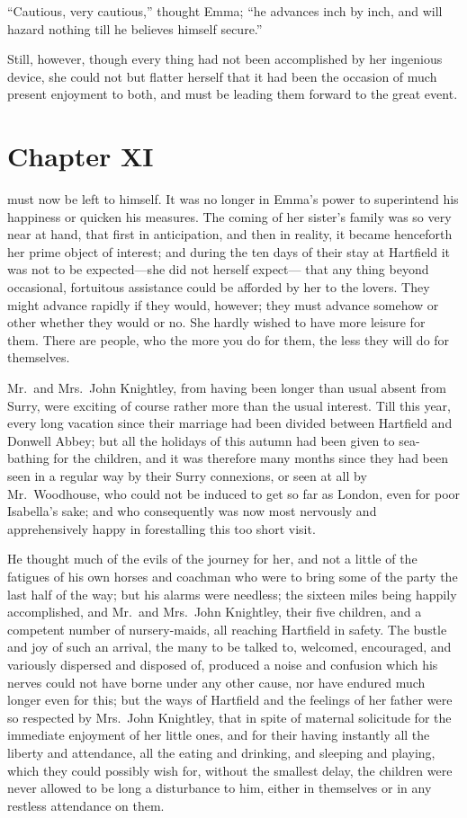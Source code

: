 ``Cautious, very cautious,'' thought Emma; ``he advances inch by inch,
and will hazard nothing till he believes himself secure.''

Still, however, though every thing had not been accomplished
by her ingenious device, she could not but flatter herself
that it had been the occasion of much present enjoyment to both,
and must be leading them forward to the great event.



\chapter{Chapter XI}


 must now be left to himself.  It was no longer in Emma's
power to superintend his happiness or quicken his measures.
The coming of her sister's family was so very near at hand,
that first in anticipation, and then in reality, it became henceforth
her prime object of interest; and during the ten days of their stay
at Hartfield it was not to be expected---she did not herself expect---%
that any thing beyond occasional, fortuitous assistance could
be afforded by her to the lovers.  They might advance rapidly
if they would, however; they must advance somehow or other whether
they would or no.  She hardly wished to have more leisure for them.
There are people, who the more you do for them, the less they will
do for themselves.

Mr.\ and Mrs.\ John Knightley, from having been longer than usual
absent from Surry, were exciting of course rather more than the
usual interest.  Till this year, every long vacation since their
marriage had been divided between Hartfield and Donwell Abbey;
but all the holidays of this autumn had been given to sea-bathing
for the children, and it was therefore many months since they had
been seen in a regular way by their Surry connexions, or seen at all
by Mr.\ Woodhouse, who could not be induced to get so far as London,
even for poor Isabella's sake; and who consequently was now most
nervously and apprehensively happy in forestalling this too short visit.

He thought much of the evils of the journey for her, and not a
little of the fatigues of his own horses and coachman who were to
bring some of the party the last half of the way; but his alarms
were needless; the sixteen miles being happily accomplished,
and Mr.\ and Mrs.\ John Knightley, their five children, and a competent
number of nursery-maids, all reaching Hartfield in safety.
The bustle and joy of such an arrival, the many to be talked to,
welcomed, encouraged, and variously dispersed and disposed of,
produced a noise and confusion which his nerves could not have borne
under any other cause, nor have endured much longer even for this;
but the ways of Hartfield and the feelings of her father were
so respected by Mrs.\ John Knightley, that in spite of maternal
solicitude for the immediate enjoyment of her little ones,
and for their having instantly all the liberty and attendance,
all the eating and drinking, and sleeping and playing,
which they could possibly wish for, without the smallest delay,
the children were never allowed to be long a disturbance to him,
either in themselves or in any restless attendance on them.

